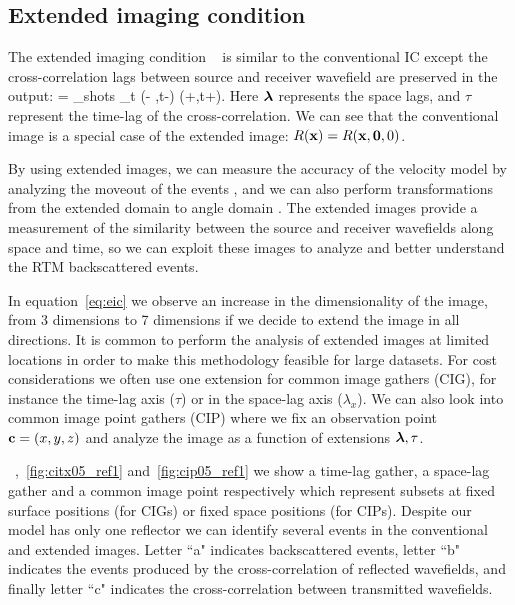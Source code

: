 \subsection{Extended imaging condition}

The extended imaging condition ~\citep{rickett:883,sava:S209,GPR:GPR888} is similar to the conventional IC except the cross-correlation
lags between source and receiver wavefield are preserved in the output:
\beq
\Re= \sum_{shots} \sum_{t} \US(\xx - \hh,t-\tau) \UR(\xx+\hh,t+\tau).
\label{eq:eic}
\eeq
Here ${\boldsymbol{\lambda}}$ represents the space lags, and $\tau$ represent the time-lag of the cross-correlation.
%
We can see that the conventional image is a special case of the extended image: $R({\bf x})=R({\bf x},{\bf 0},0)$.

By using extended images, we can measure the accuracy of the velocity model by analyzing the moveout of the events
 \citep{yang:S151}, and we can also perform transformations from the extended domain to angle domain 
\citep{sava:1065,sava:S209,sava:S131}. The extended images provide a measurement of the similarity between the source
 and receiver wavefields along space and time, so we can exploit these images to analyze and better understand the RTM backscattered events.

In equation~\ref{eq:eic} we observe an increase in the dimensionality of the image, from 3 dimensions to 7 dimensions
if we decide to extend the image in all directions. It is common to perform the analysis 
of extended images at limited locations in order to make this methodology feasible for large datasets. 
For cost considerations we often use one extension for common image gathers (CIG), for instance
 the time-lag axis ($\tau$) or in the space-lag axis ($\lambda_x$). We can also look into common image point gathers (CIP) where we 
fix an observation point ${\bf c}=(x,y,z)$ and analyze the image as a function of extensions ${\boldsymbol{\lambda}},\tau$. 

~,~\ref{fig:citx05_ref1} and~\ref{fig:cip05_ref1} we show a time-lag gather, a space-lag gather
 and a common image point respectively which represent subsets at fixed surface positions (for CIGs) or fixed space positions 
(for CIPs). Despite our model has only one reflector we can identify several events in the conventional and extended images. 
Letter ``a" indicates backscattered events, letter ``b" indicates the events produced by the cross-correlation of 
reflected wavefields, and finally letter ``c" indicates the cross-correlation between transmitted wavefields.

